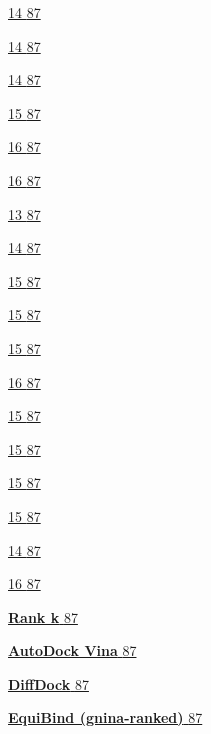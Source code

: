 \protect\hyperlink{_Toc235736101}{14 \protect\hyperlink{_Toc235736101}{87}}

\protect\hyperlink{_Toc235736102}{14 \protect\hyperlink{_Toc235736102}{87}}

\protect\hyperlink{_Toc235736103}{14 \protect\hyperlink{_Toc235736103}{87}}

\protect\hyperlink{_Toc235736104}{15 \protect\hyperlink{_Toc235736104}{87}}

\protect\hyperlink{_Toc235736105}{16 \protect\hyperlink{_Toc235736105}{87}}

\protect\hyperlink{_Toc235736106}{16 \protect\hyperlink{_Toc235736106}{87}}

\protect\hyperlink{_Toc235736107}{13 \protect\hyperlink{_Toc235736107}{87}}

\protect\hyperlink{_Toc235736108}{14 \protect\hyperlink{_Toc235736108}{87}}

\protect\hyperlink{_Toc235736109}{15 \protect\hyperlink{_Toc235736109}{87}}

\protect\hyperlink{_Toc235736110}{15 \protect\hyperlink{_Toc235736110}{87}}

\protect\hyperlink{_Toc235736111}{15 \protect\hyperlink{_Toc235736111}{87}}

\protect\hyperlink{_Toc235736112}{16 \protect\hyperlink{_Toc235736112}{87}}

\protect\hyperlink{_Toc235736113}{15 \protect\hyperlink{_Toc235736113}{87}}

\protect\hyperlink{_Toc235736114}{15 \protect\hyperlink{_Toc235736114}{87}}

\protect\hyperlink{_Toc235736115}{15 \protect\hyperlink{_Toc235736115}{87}}

\protect\hyperlink{_Toc235736116}{15 \protect\hyperlink{_Toc235736116}{87}}

\protect\hyperlink{_Toc235736117}{14 \protect\hyperlink{_Toc235736117}{87}}

\protect\hyperlink{_Toc235736118}{16 \protect\hyperlink{_Toc235736118}{87}}

\protect\hyperlink{_Toc235736119}{\textbf{Rank k} \protect\hyperlink{_Toc235736119}{87}}

\protect\hyperlink{_Toc235736120}{\textbf{AutoDock Vina} \protect\hyperlink{_Toc235736120}{87}}

\protect\hyperlink{_Toc235736121}{\textbf{DiffDock} \protect\hyperlink{_Toc235736121}{87}}

\protect\hyperlink{_Toc235736122}{\textbf{EquiBind (gnina-ranked)} \protect\hyperlink{_Toc235736122}{87}}


